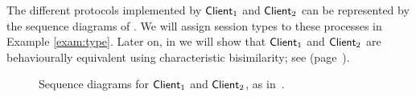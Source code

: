 %
%
%

The different protocols implemented by $\mathsf{Client}_1$ and $\mathsf{Client}_2$ can be represented by the sequence diagrams of . 
We will assign session types to these  processes in Example \ref{exam:type}.
Later on, in
 we will show that $\mathsf{Client}_1$ and $\mathsf{Client}_2$ are behaviourally equivalent using characteristic bisimilarity;
see  (page~\pageref{p:examp}).
\begin{figure}

\caption{Sequence diagrams for $\mathsf{Client}_1$ and $\mathsf{Client}_2$, as in~\label{fig:exam}.}
\end{figure}
